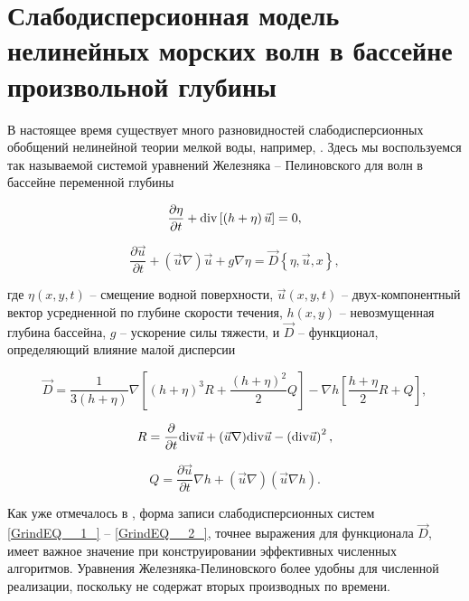 
\section{Слабодисперсионная модель нелинейных морских волн в бассейне произвольной глубины }
В настоящее время существует много разновидностей слабодисперсионных обобщений нелинейной теории мелкой воды, например, \cite{Green_1976}\cite{Zhel_1985} \cite{Fedotova_2008} \cite{Fedotova_2012}. Здесь мы воспользуемся так называемой системой уравнений Железняка -- Пелиновского для волн в бассейне переменной глубины \cite{Zhel_Pel_1985}

\begin{equation} \label{GrindEQ__1_}
\frac{\partial \eta }{\partial t} +{\rm div}\left[\left(h+\eta \right)\vec{u}\right]=0,
\end{equation}

\begin{equation} \label{GrindEQ__2_}
\frac{\partial \vec{u}}{\partial t} +(\vec{u}\nabla )\vec{u}+g\nabla \eta =\vec{D}\left\{\eta ,\vec{u},x\right\},
\end{equation}


где $\eta(x,y,t)$ -- смещение водной поверхности, $\vec{u}(x,y,t)$ -- двух-компонентный вектор усредненной по глубине скорости течения, $h(x,y)$ -- невозмущенная глубина бассейна, $g$ -- ускорение силы тяжести, и $\vec{D}$ -- функционал, определяющий влияние малой дисперсии


\begin{equation} \label{GrindEQ__3_}
\vec{D}=\frac{1}{3\left(h+\eta \right)} \nabla \left[\left(h+\eta \right)^{3} R+\frac{(h+\eta )^{2} }{2} Q\right]-\nabla h\left[\frac{h+\eta }{2} R+Q\right],
\end{equation}

\begin{equation} \label{GrindEQ__4_}
R=\frac{\partial }{\partial t} {\rm div}\vec{u}+(\vec{u}\nabla ){\rm div}\vec{u}-\left({\rm div}\vec{u}\right)^{2} ,
\end{equation}

\begin{equation} \label{GrindEQ__5_}
Q=\frac{\partial \vec{u}}{\partial t} \nabla h+(\vec{u}\nabla )(\vec{u}\nabla h).
\end{equation}


Как уже отмечалось в \cite{Fedotova_2008}, форма записи слабодисперсионных систем \eqref{GrindEQ__1_} -- \eqref{GrindEQ__2_}, точнее выражения для функционала $\vec{D}$, имеет важное значение при конструировании эффективных численных алгоритмов. Уравнения Железняка-Пелиновского более удобны для численной реализации, поскольку не содержат вторых производных по времени.


